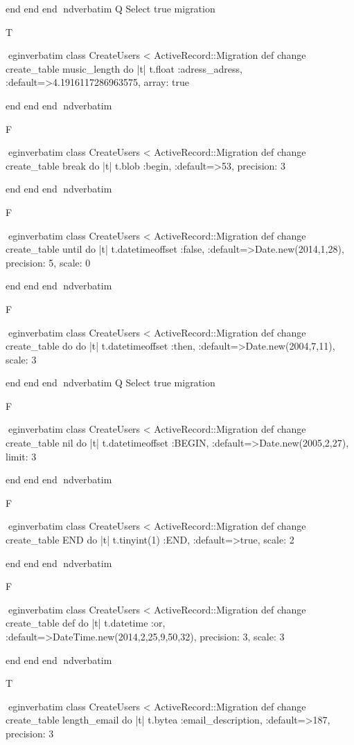     end 
  end 
end
nd{verbatim}
Q
 Select true migration

T

egin{verbatim}
 class CreateUsers < ActiveRecord::Migration 
  def change 
    create_table music_length do |t| 
      t.float :adress_adress, :default=>4.1916117286963575, array: true
    
    end 
  end 
end
nd{verbatim}

F

egin{verbatim}
 class CreateUsers < ActiveRecord::Migration 
  def change 
    create_table break do |t| 
      t.blob :begin, :default=>53, precision: 3
    
    end 
  end 
end
nd{verbatim}

F

egin{verbatim}
 class CreateUsers < ActiveRecord::Migration 
  def change 
    create_table until do |t| 
      t.datetimeoffset :false, :default=>Date.new(2014,1,28), precision: 5, scale: 0
    
    end 
  end 
end
nd{verbatim}

F

egin{verbatim}
 class CreateUsers < ActiveRecord::Migration 
  def change 
    create_table do do |t| 
      t.datetimeoffset :then, :default=>Date.new(2004,7,11), scale: 3
    
    end 
  end 
end
nd{verbatim}
Q
 Select true migration

F

egin{verbatim}
 class CreateUsers < ActiveRecord::Migration 
  def change 
    create_table nil do |t| 
      t.datetimeoffset :BEGIN, :default=>Date.new(2005,2,27), limit: 3
    
    end 
  end 
end
nd{verbatim}

F

egin{verbatim}
 class CreateUsers < ActiveRecord::Migration 
  def change 
    create_table END do |t| 
      t.tinyint(1) :END, :default=>true, scale: 2
    
    end 
  end 
end
nd{verbatim}

F

egin{verbatim}
 class CreateUsers < ActiveRecord::Migration 
  def change 
    create_table def do |t| 
      t.datetime :or, :default=>DateTime.new(2014,2,25,9,50,32), precision: 3, scale: 3
    
    end 
  end 
end
nd{verbatim}

T

egin{verbatim}
 class CreateUsers < ActiveRecord::Migration 
  def change 
    create_table length_email do |t| 
      t.bytea :email_description, :default=>187, precision: 3
    

